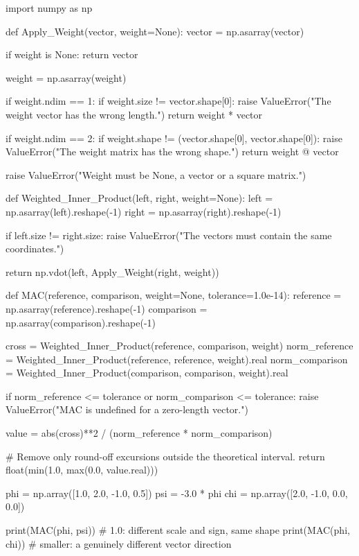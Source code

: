 \begin{python}
import numpy as np


def Apply_Weight(vector, weight=None):
    vector = np.asarray(vector)

    if weight is None:
        return vector

    weight = np.asarray(weight)

    if weight.ndim == 1:
        if weight.size != vector.shape[0]:
            raise ValueError("The weight vector has the wrong length.")
        return weight * vector

    if weight.ndim == 2:
        if weight.shape != (vector.shape[0], vector.shape[0]):
            raise ValueError("The weight matrix has the wrong shape.")
        return weight @ vector

    raise ValueError("Weight must be None, a vector or a square matrix.")


def Weighted_Inner_Product(left, right, weight=None):
    left = np.asarray(left).reshape(-1)
    right = np.asarray(right).reshape(-1)

    if left.size != right.size:
        raise ValueError("The vectors must contain the same coordinates.")

    return np.vdot(left, Apply_Weight(right, weight))


def MAC(reference, comparison, weight=None, tolerance=1.0e-14):
    reference = np.asarray(reference).reshape(-1)
    comparison = np.asarray(comparison).reshape(-1)

    cross = Weighted_Inner_Product(reference, comparison, weight)
    norm_reference = Weighted_Inner_Product(reference, reference, weight).real
    norm_comparison = Weighted_Inner_Product(comparison, comparison, weight).real

    if norm_reference <= tolerance or norm_comparison <= tolerance:
        raise ValueError("MAC is undefined for a zero-length vector.")

    value = abs(cross)**2 / (norm_reference * norm_comparison)

    # Remove only round-off excursions outside the theoretical interval.
    return float(min(1.0, max(0.0, value.real)))


phi = np.array([1.0, 2.0, -1.0, 0.5])
psi = -3.0 * phi
chi = np.array([2.0, -1.0, 0.0, 0.0])

print(MAC(phi, psi))  # 1.0: different scale and sign, same shape
print(MAC(phi, chi))  # smaller: a genuinely different vector direction
\end{python}

